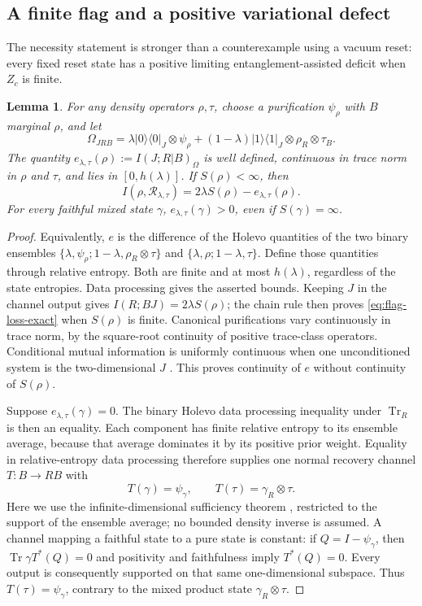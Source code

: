 \documentclass[11pt]{article}
\newtheorem{lemma}[theorem]{Lemma}
\newcommand{\Tr}{\operatorname{Tr}}
\newcommand{\Rcal}{\mathcal R_{\lambda,\tau}}
\begin{document}
\subsection{A finite flag and a positive variational defect}
The necessity statement is stronger than a counterexample using a
vacuum reset: every fixed reset state has a positive limiting
entanglement-assisted deficit when $Z_c$ is finite.

\begin{lemma}\label{lem:flag-continuity}
For any density operators $\rho,\tau$, choose a purification
$\psi_\rho$ with $B$ marginal $\rho$, and let
\[
 \Omega_{JRB}=
 \lambda|0\rangle\langle0|_J\otimes\psi_\rho
 +(1-\lambda)|1\rangle\langle1|_J\otimes\rho_R\otimes\tau_B.
\]
The quantity $e_{\lambda,\tau}(\rho):=I(J;R|B)_\Omega$ is
well defined, continuous in trace norm in $\rho$ and $\tau$, and
lies in $[0,h(\lambda)]$. If $S(\rho)<\infty$, then
\begin{equation}\label{eq:flag-loss-exact}
 I(\rho,\Rcal)=2\lambda S(\rho)-e_{\lambda,\tau}(\rho).
\end{equation}
For every faithful mixed state $\gamma$,
$e_{\lambda,\tau}(\gamma)>0$, even if $S(\gamma)=\infty$.
\end{lemma}
\begin{proof}
Equivalently, $e$ is the difference of the Holevo quantities of
the two binary ensembles
$\{\lambda,\psi_\rho;1-\lambda,\rho_R\otimes\tau\}$ and
$\{\lambda,\rho;1-\lambda,\tau\}$.
Define those quantities through relative entropy. Both are finite
and at most $h(\lambda)$, regardless of the state entropies.
Data processing gives the asserted bounds. Keeping $J$ in the
channel output gives $I(R;BJ)=2\lambda S(\rho)$; the chain rule
then proves \eqref{eq:flag-loss-exact} when $S(\rho)$ is finite.
Canonical purifications vary continuously in trace norm, by the
square-root continuity of positive trace-class operators. Conditional
mutual information is uniformly continuous when one unconditioned
system is the two-dimensional $J$
\cite[Corollary 1, equation (25)]{shirokovcontinuity}.
This proves continuity of $e$ without continuity of $S(\rho)$.

Suppose $e_{\lambda,\tau}(\gamma)=0$. The binary Holevo data
processing inequality under $\Tr_R$ is then an equality.
Each component has finite relative entropy to its ensemble average,
because that average dominates it by its positive prior weight.
Equality in relative-entropy data processing therefore supplies one
normal recovery channel $T:B\to RB$ with
\[
 T(\gamma)=\psi_\gamma,\qquad
 T(\tau)=\gamma_R\otimes\tau.
\]
Here we use the infinite-dimensional sufficiency theorem
\cite[Section 2.3, Theorem 2]{jencova}, restricted to the support
of the ensemble average; no bounded density inverse is assumed.
A channel mapping a faithful state to a pure state is constant:
if $Q=I-\psi_\gamma$, then
$\Tr\gamma T^*(Q)=0$ and positivity and faithfulness imply
$T^*(Q)=0$. Every output is consequently supported on that same
one-dimensional subspace. Thus $T(\tau)=\psi_\gamma$, contrary
to the mixed product state $\gamma_R\otimes\tau$.
\end{proof}
\end{document}
